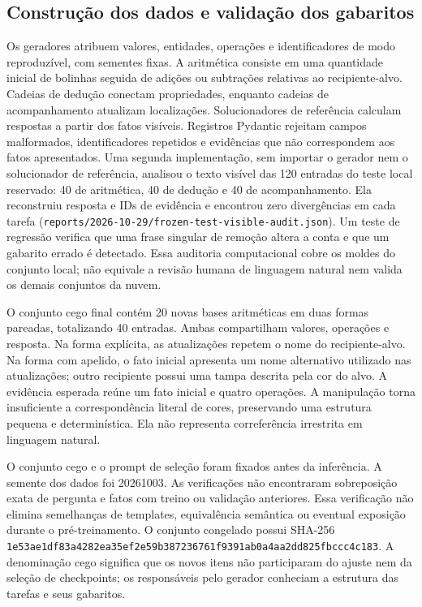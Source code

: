 \documentclass[12pt,a4paper]{article}
\begin{document}
\subsection{Construção dos dados e validação dos gabaritos}
Os geradores atribuem valores, entidades, operações e identificadores de modo reproduzível, com sementes fixas. A aritmética consiste em uma quantidade inicial de bolinhas seguida de adições ou subtrações relativas ao recipiente-alvo. Cadeias de dedução conectam propriedades, enquanto cadeias de acompanhamento atualizam localizações. Solucionadores de referência calculam respostas a partir dos fatos visíveis. Registros Pydantic rejeitam campos malformados, identificadores repetidos e evidências que não correspondem aos fatos apresentados. Uma segunda implementação, sem importar o gerador nem o solucionador de referência, analisou o texto visível das 120 entradas do teste local reservado: 40 de aritmética, 40 de dedução e 40 de acompanhamento. Ela reconstruiu resposta e IDs de evidência e encontrou zero divergências em cada tarefa (\texttt{reports/2026-10-29/frozen-test-visible-audit.json}). Um teste de regressão verifica que uma frase singular de remoção altera a conta e que um gabarito errado é detectado. Essa auditoria computacional cobre os moldes do conjunto local; não equivale a revisão humana de linguagem natural nem valida os demais conjuntos da nuvem.

O conjunto cego final contém 20 novas bases aritméticas em duas formas pareadas, totalizando 40 entradas. Ambas compartilham valores, operações e resposta. Na forma explícita, as atualizações repetem o nome do recipiente-alvo. Na forma com apelido, o fato inicial apresenta um nome alternativo utilizado nas atualizações; outro recipiente possui uma tampa descrita pela cor do alvo. A evidência esperada reúne um fato inicial e quatro operações. A manipulação torna insuficiente a correspondência literal de cores, preservando uma estrutura pequena e determinística. Ela não representa correferência irrestrita em linguagem natural.

O conjunto cego e o prompt de seleção foram fixados antes da inferência. A semente dos dados foi 20261003. As verificações não encontraram sobreposição exata de pergunta e fatos com treino ou validação anteriores. Essa verificação não elimina semelhanças de templates, equivalência semântica ou eventual exposição durante o pré-treinamento. O conjunto congelado possui SHA-256 \nolinkurl{1e53ae1df83a4282ea35ef2e59b387236761f9391ab0a4aa2dd825fbccc4c183}. A denominação cego significa que os novos itens não participaram do ajuste nem da seleção de checkpoints; os responsáveis pelo gerador conheciam a estrutura das tarefas e seus gabaritos.
\end{document}
